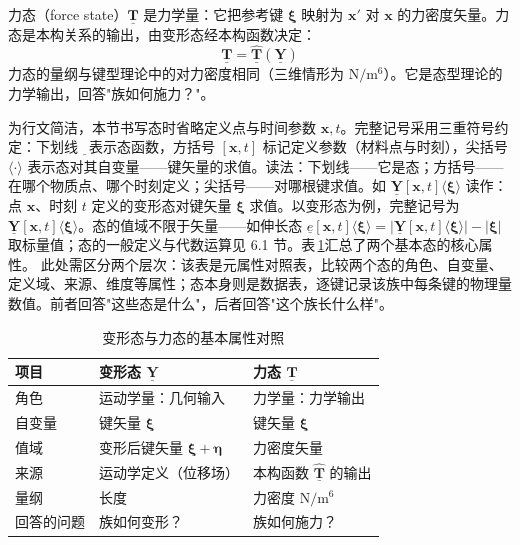 力态（force state）$\underline{\mathbf{T}}$ 是力学量：它把参考键 $\boldsymbol{\xi}$ 映射为 $\mathbf{x}'$ 对 $\mathbf{x}$ 的力密度矢量。力态是本构关系的输出，由变形态经本构函数决定：
\begin{equation}
  \underline{\mathbf{T}}=\hat{\underline{\mathbf{T}}}(\underline{\mathbf{Y}})
  \label{eq:state-force-ch02}
\end{equation}
力态的量纲与键型理论中的对力密度相同（三维情形为 $\mathrm{N/m^{6}}$）。它是态型理论的力学输出，回答"族如何施力？"。

为行文简洁，本节书写态时省略定义点与时间参数 $\mathbf{x},t$。完整记号采用三重符号约定：下划线 $\underline{\;}$\,表示态函数，方括号 $[\mathbf{x},t]$ 标记定义参数（材料点与时刻），尖括号 $\langle\cdot\rangle$ 表示态对其自变量——键矢量的求值。读法：下划线——它是态；方括号——在哪个物质点、哪个时刻定义；尖括号——对哪根键求值。如 $\underline{\mathbf{Y}}[\mathbf{x},t]\langle\boldsymbol{\xi}\rangle$ 读作：点 $\mathbf{x}$、时刻 $t$ 定义的变形态对键矢量 $\boldsymbol{\xi}$ 求值。以变形态为例，完整记号为 $\underline{\mathbf{Y}}[\mathbf{x},t]\langle\boldsymbol{\xi}\rangle$。态的值域不限于矢量——如伸长态 $\underline{e}[\mathbf{x},t]\langle\boldsymbol{\xi}\rangle=\bigl|\underline{\mathbf{Y}}[\mathbf{x},t]\langle\boldsymbol{\xi}\rangle\bigr|-|\boldsymbol{\xi}|$ 取标量值；态的一般定义与代数运算见 6.1 节。表\,\ref{tab:state-yt-comparison}汇总了两个基本态的核心属性。
此处需区分两个层次：该表是元属性对照表，比较两个态的角色、自变量、定义域、来源、维度等属性；态本身则是数据表，逐键记录该族中每条键的物理量数值。前者回答"这些态是什么"，后者回答"这个族长什么样"。

\begin{table}[htbp]
  \centering
  \small
  \caption{变形态与力态的基本属性对照}
  \label{tab:state-yt-comparison}
  \begin{tabular}{>{\raggedright\arraybackslash}p{}>{\raggedright\arraybackslash}p{}>{\raggedright\arraybackslash}p{}}
    \toprule
    项目 & 变形态 $\underline{\mathbf{Y}}$ & 力态 $\underline{\mathbf{T}}$ \\
    \midrule
    角色 & 运动学量：几何输入 & 力学量：力学输出 \\
    自变量 & 键矢量 $\boldsymbol{\xi}$ & 键矢量 $\boldsymbol{\xi}$ \\
    值域 & 变形后键矢量 $\boldsymbol{\xi}+\boldsymbol{\eta}$ & 力密度矢量 \\
    来源 & 运动学定义（位移场） & 本构函数 $\hat{\underline{\mathbf{T}}}$ 的输出 \\
    量纲 & 长度 & 力密度 $\mathrm{N/m^{6}}$ \\
    回答的问题 & 族如何变形？ & 族如何施力？ \\
    \bottomrule
      \end{tabular}
\end{table}

